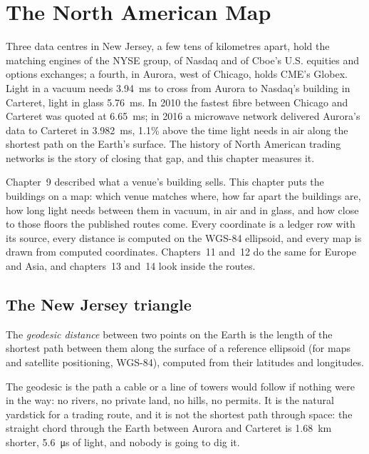 \chapter{The North American Map}\label{ch:nw:the-north-american-map}

Three data centres in New Jersey, a few tens of kilometres apart, hold the matching engines of the NYSE group, of Nasdaq and of Cboe's U.S.
equities and options exchanges; a fourth, in Aurora, west of Chicago, holds CME's Globex. Light in a vacuum needs \qty{3.94}{\milli\second}
to cross from Aurora to Nasdaq's building in Carteret, light in glass \qty{5.76}{\milli\second}. In 2010 the fastest fibre between
Chicago and Carteret was quoted at \qty{6.65}{\milli\second}; in 2016 a microwave network delivered Aurora's data to Carteret in
\qty{3.982}{\milli\second}, 1.1\% above the time light needs in air along the shortest path on the Earth's surface. The history of North
American trading networks is the story of closing that gap, and this chapter measures it.

Chapter~9 described what a venue's building sells. This chapter puts the buildings on a map: which venue matches where, how far apart the
buildings are, how long light needs between them in vacuum, in air and in glass, and how close to those floors the published routes come.
Every coordinate is a ledger row with its source, every distance is computed on the WGS-84 ellipsoid, and every map is drawn from
computed coordinates. Chapters~11 and~12 do the same for Europe and Asia, and chapters~13 and~14 look inside the routes.

\section{The New Jersey triangle}

\begin{definition}\label{def:nw:the-north-american-map:geodesic}
The \emph{geodesic distance} between two points on the Earth is the length of the shortest path between them along
the surface of a reference ellipsoid (for maps and satellite positioning, WGS-84), computed from their latitudes and longitudes.
\end{definition}

The geodesic is the path a cable or a line of towers would follow if nothing were in the way: no rivers, no private land, no hills, no
permits. It is the natural yardstick for a trading route, and it is not the shortest path through space: the straight chord through the
Earth between Aurora and Carteret is \qty{1.68}{\kilo\metre} shorter, \qty{5.6}{\micro\second} of light, and nobody is going to dig it.

